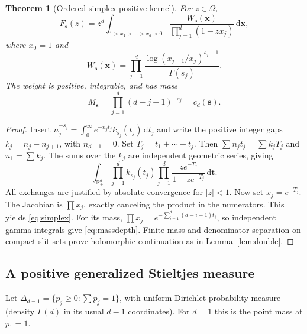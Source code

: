 \documentclass[11pt]{article}
\numberwithin{equation}{section}
\newtheorem{theorem}{Theorem}[section]
\theoremstyle{definition}
\theoremstyle{remark}
\newcommand{\dd}{\,\mathrm d}
\newcommand{\R}{\mathbb R}
\newcommand{\cut}{\Omega}
\newcommand{\sv}{\boldsymbol s}
\newcommand{\xv}{\boldsymbol x}
\newcommand{\tv}{\boldsymbol t}
\begin{document}
\begin{theorem}[Ordered-simplex positive kernel]\label{thm:simplex}
For $z\in\cut$,
\begin{equation}\label{eq:simplex}
 F_{\sv}(z)=z^d\int_{1>x_1>\cdots>x_d>0}
 \frac{W_{\sv}(\xv)}{\prod_{j=1}^d(1-zx_j)}\dd\xv,
\end{equation}
where $x_0=1$ and
\begin{equation}\label{eq:simplexweight}
 W_{\sv}(\xv)=\prod_{j=1}^d
      \frac{\log(x_{j-1}/x_j)^{s_j-1}}{\Gamma(s_j)}.
\end{equation}
The weight is positive, integrable, and has mass
\begin{equation}\label{eq:massdepth}
 M_{\sv}=\prod_{j=1}^d(d-j+1)^{-s_j}=c_d(\sv).
\end{equation}
\end{theorem}
\begin{proof}
Insert $n_j^{-s_j}=\int_0^\infty e^{-n_jt_j}k_{s_j}(t_j)\dd t_j$
and write the positive integer gaps $k_j=n_j-n_{j+1}$, with
$n_{d+1}=0$. Set $T_j=t_1+\cdots+t_j$. Then
$\sum n_jt_j=\sum k_jT_j$ and $n_1=\sum k_j$.
The sums over the $k_j$ are independent geometric series, giving
\[
 \int_{\R_+^d}\prod_{j=1}^d k_{s_j}(t_j)
          \prod_{j=1}^d\frac{ze^{-T_j}}{1-ze^{-T_j}}\dd\tv.
\]
All exchanges are justified by absolute convergence for $|z|<1$.
Now set $x_j=e^{-T_j}$. The Jacobian is $\prod x_j$, exactly
canceling the product in the numerators. This yields
\eqref{eq:simplex}. For its mass, $\prod x_j=e^{-\sum_{i=1}^d(d-i+1)t_i}$,
so independent gamma integrals give \eqref{eq:massdepth}.
Finite mass and denominator separation on compact slit sets prove
holomorphic continuation as in Lemma~\ref{lem:double}.
\end{proof}

\subsection{A positive generalized Stieltjes measure}
Let $\Delta_{d-1}=\{p_j\ge0:\sum p_j=1\}$, with uniform Dirichlet
probability measure (density $\Gamma(d)$ in its usual $d-1$ coordinates).
For $d=1$ this is the point mass at $p_1=1$.
\end{document}
